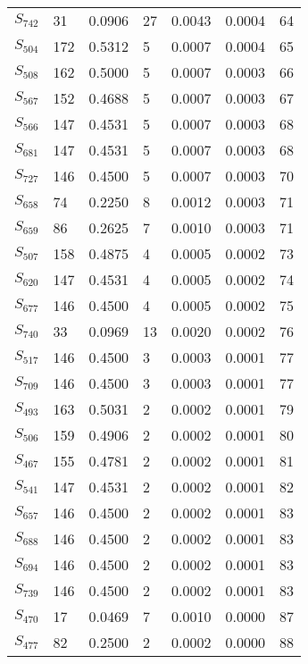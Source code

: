 \begin{xltabular}{\textwidth}{XPPPPPP}
  $S_{742}$ & 31 & 0.0906 & 27 & 0.0043 & 0.0004 & 64 \\ 
  $S_{504}$ & 172 & 0.5312 & 5 & 0.0007 & 0.0004 & 65 \\ 
  $S_{508}$ & 162 & 0.5000 & 5 & 0.0007 & 0.0003 & 66 \\ 
  $S_{567}$ & 152 & 0.4688 & 5 & 0.0007 & 0.0003 & 67 \\ 
  $S_{566}$ & 147 & 0.4531 & 5 & 0.0007 & 0.0003 & 68 \\ 
  $S_{681}$ & 147 & 0.4531 & 5 & 0.0007 & 0.0003 & 68 \\ 
  $S_{727}$ & 146 & 0.4500 & 5 & 0.0007 & 0.0003 & 70 \\ 
  $S_{658}$ & 74 & 0.2250 & 8 & 0.0012 & 0.0003 & 71 \\ 
  $S_{659}$ & 86 & 0.2625 & 7 & 0.0010 & 0.0003 & 71 \\ 
  $S_{507}$ & 158 & 0.4875 & 4 & 0.0005 & 0.0002 & 73 \\ 
  $S_{620}$ & 147 & 0.4531 & 4 & 0.0005 & 0.0002 & 74 \\ 
  $S_{677}$ & 146 & 0.4500 & 4 & 0.0005 & 0.0002 & 75 \\ 
  $S_{740}$ & 33 & 0.0969 & 13 & 0.0020 & 0.0002 & 76 \\ 
  $S_{517}$ & 146 & 0.4500 & 3 & 0.0003 & 0.0001 & 77 \\ 
  $S_{709}$ & 146 & 0.4500 & 3 & 0.0003 & 0.0001 & 77 \\ 
  $S_{493}$ & 163 & 0.5031 & 2 & 0.0002 & 0.0001 & 79 \\ 
  $S_{506}$ & 159 & 0.4906 & 2 & 0.0002 & 0.0001 & 80 \\ 
  $S_{467}$ & 155 & 0.4781 & 2 & 0.0002 & 0.0001 & 81 \\ 
  $S_{541}$ & 147 & 0.4531 & 2 & 0.0002 & 0.0001 & 82 \\ 
  $S_{657}$ & 146 & 0.4500 & 2 & 0.0002 & 0.0001 & 83 \\ 
  $S_{688}$ & 146 & 0.4500 & 2 & 0.0002 & 0.0001 & 83 \\ 
  $S_{694}$ & 146 & 0.4500 & 2 & 0.0002 & 0.0001 & 83 \\ 
  $S_{739}$ & 146 & 0.4500 & 2 & 0.0002 & 0.0001 & 83 \\ 
  $S_{470}$ & 17 & 0.0469 & 7 & 0.0010 & 0.0000 & 87 \\ 
  $S_{477}$ & 82 & 0.2500 & 2 & 0.0002 & 0.0000 & 88 \\ 

\end{xltabular}
